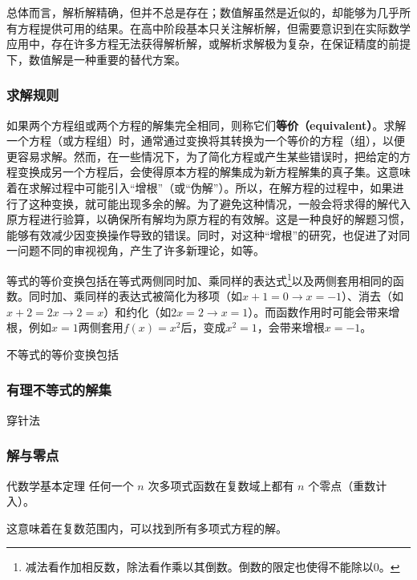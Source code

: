 总体而言，解析解精确，但并不总是存在；数值解虽然是近似的，却能够为几乎所有方程提供可用的结果。在高中阶段基本只关注解析解，但需要意识到在实际数学应用中，存在许多方程无法获得解析解，或解析求解极为复杂，在保证精度的前提下，数值解是一种重要的替代方案。

\subsubsection{求解规则}

如果两个方程组或两个方程的解集完全相同，则称它们\textbf{等价（equivalent）}。求解一个方程（或方程组）时，通常通过变换将其转换为一个等价的方程（组），以便更容易求解。然而，在一些情况下，为了简化方程或产生某些错误时，把给定的方程变换成另一个方程后，会使得原本方程的解集成为新方程解集的真子集。这意味着在求解过程中可能引入“增根”（或“伪解”）。所以，在解方程的过程中，如果进行了这种变换，就可能出现多余的解。为了避免这种情况，一般会将求得的解代入原方程进行验算，以确保所有解均为原方程的有效解。这是一种良好的解题习惯，能够有效减少因变换操作导致的错误。同时，对这种“增根”的研究，也促进了对同一问题不同的审视视角，产生了许多新理论，如等。

等式的等价变换包括在等式两侧同时加、乘同样的表达式\footnote{减法看作加相反数，除法看作乘以其倒数。倒数的限定也使得不能除以$0$。}以及两侧套用相同的函数。同时加、乘同样的表达式被简化为移项（如$x+1=0\to x=-1$）、消去（如$x+2=2x\to 2=x$）和约化（如$2x=2\to x=1$）。而函数作用时可能会带来增根，例如$x=1$两侧套用$f(x)=x^2$后，变成$x^2=1$，会带来增根$x=-1$。

不等式的等价变换包括

\subsubsection{有理不等式的解集}

穿针法

\subsubsection{解与零点}

\begin{definition}{代数学基本定理}
任何一个 $n$ 次多项式函数在复数域上都有 $n$ 个零点（重数计入）。
\end{definition}
这意味着在复数范围内，可以找到所有多项式方程的解。



